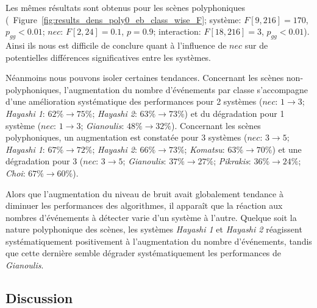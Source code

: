 Les mêmes résultats sont obtenus pour les scènes polyphoniques (\cf~Figure~\ref{fig:results_dens_poly0_eb_class_wise_F}; système: $F[9,216]=170$, $p_{gg}<0.01$; $nec$: $F[2,24]=0.1$, $p=0.9$; interaction: $F[18,216]=3$, $p_{gg}<0.01$). Ainsi ils nous est difficile de conclure quant à l'influence de $nec$ sur de potentielles différences significatives entre les systèmes.

Néanmoins nous pouvons isoler certaines tendances. Concernant les scènes non-polyphoniques, l'augmentation du nombre d'événements par classe s'accompagne d'une amélioration systématique des performances pour 2 systèmes ($nec$: $1\rightarrow 3$; \emph{Hayashi 1}: $62\%\rightarrow 75\%$; \emph{Hayashi 2}: $63\%\rightarrow 73\%$) et du dégradation pour 1 système ($nec$: $1\rightarrow 3$; \emph{Gianoulis}: $48\%\rightarrow 32\%$). Concernant les scènes polyphoniques, un augmentation est constatée pour 3 systèmes ($nec$: $3\rightarrow 5$; \emph{Hayashi 1}: $67\%\rightarrow 72\%$; \emph{Hayashi 2}: $66\%\rightarrow 73\%$; \emph{Komatsu}: $63\%\rightarrow 70\%$) et une dégradation pour 3 ($nec$: $3\rightarrow 5$; \emph{Gianoulis}: $37\%\rightarrow 27\%$; \emph{Pikrakis}: $36\%\rightarrow 24\%$; \emph{Choi}: $67\%\rightarrow 60\%$).

Alors que l'augmentation du niveau de bruit avait globalement tendance à diminuer les performances des algorithmes, il apparaît que la réaction aux nombres d'événements à détecter varie d'un système à l'autre. Quelque soit la nature polyphonique des scènes, les systèmes \emph{Hayashi 1} et \emph{Hayashi 2} réagissent systématiquement positivement à l'augmentation du nombre d'événements, tandis que cette dernière semble dégrader systématiquement les performances de \emph{Gianoulis}.

\subsection{Discussion}





